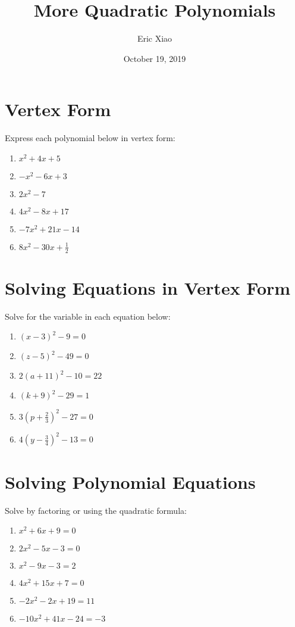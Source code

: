 \documentclass[11pt]{extarticle}
\title{\textbf{More Quadratic Polynomials}}
\author{Eric Xiao}
\date{October 19, 2019}
\begin{document}
\maketitle

\section{Vertex Form}
{Express each polynomial below in vertex form:}
\begin{enumerate}
    \item {$x^2 + 4x + 5$}
    \item {$-x^2 - 6x + 3$}
    \item {$2x^2 - 7$}
    \item {$4x^2 - 8x + 17$}
    \item {$-7x^2 + 21x - 14$}
    \item {$8x^2 - 30x + \frac{1}{2}$}
\end{enumerate}

\section{Solving Equations in Vertex Form}
{Solve for the variable in each equation below:}
\begin{enumerate}
    \item {$(x - 3)^2 - 9 = 0$}
    \item {$(z - 5)^2 - 49 = 0$}
    \item {$2(a + 11)^2 - 10 = 22$}
    \item {$(k + 9)^2 - 29 = 1$}
    \item {$3(p + \frac{2}{3})^2 - 27 = 0$}
    \item {$4(y - \frac{3}{4})^2 - 13 = 0$}
\end{enumerate}

\section{Solving Polynomial Equations}
{Solve by factoring or using the quadratic formula:}
\begin{enumerate}
    \item {$x^2 + 6x + 9 = 0$}
    \item {$2x^2 - 5x - 3 = 0$}
    \item {$x^2 - 9x - 3 = 2$}
    \item {$4x^2 + 15x + 7 = 0$}
    \item {$-2x^2 - 2x + 19 = 11$}
    \item {$-10x^2 + 41x - 24 = -3$}
\end{enumerate}
\end{document}
